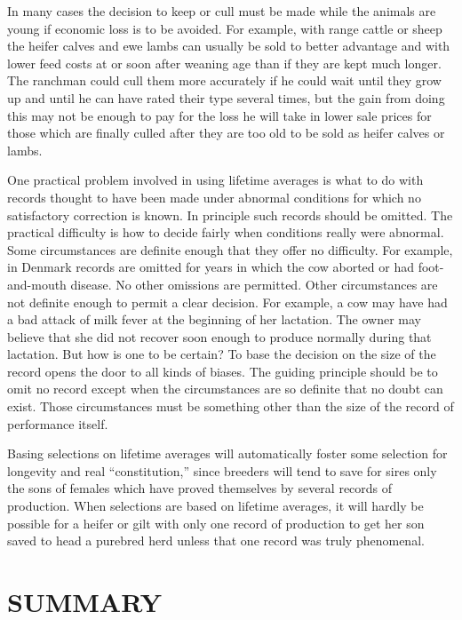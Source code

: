 In many cases the decision to keep or cull must be made while the
animals are young if economic loss is to be avoided. For example, with
range cattle or sheep the heifer calves and ewe lambs can usually be
sold to better advantage and with lower feed costs at or soon after weaning
age than if they are kept much longer. The ranchman could cull
them more accurately if he could wait until they grow up and until he
can have rated their type several times, but the gain from doing this
may not be enough to pay for the loss he will take in lower sale prices
for those which are finally culled after they are too old to be sold as
heifer calves or lambs.

One practical problem involved in using lifetime averages is what
to do with records thought to have been made under abnormal conditions
for which no satisfactory correction is known. In principle such
records should be omitted. The practical difficulty is how to decide
fairly when conditions really were abnormal. Some circumstances are
definite enough that they offer no difficulty. For example, in Denmark
records are omitted for years in which the cow aborted or had foot-and-mouth
disease. No other omissions are permitted. Other circumstances
are not definite enough to permit a clear decision. For example, a cow
may have had a bad attack of milk fever at the beginning of her lactation.
The owner may believe that she did not recover soon enough to
produce normally during that lactation. But how is one to be certain?
To base the decision on the size of the record opens the door to all
kinds of biases. The guiding principle should be to omit no record
except when the circumstances are so definite that no doubt can exist.
Those circumstances must be something other than the size of the record
of performance itself.

Basing selections on lifetime averages will automatically foster some
selection for longevity and real ``constitution,'' since breeders will tend
to save for sires only the sons of females which have proved themselves
by several records of production. When selections are based on lifetime
averages, it will hardly be possible for a heifer or gilt with only one
record of production to get her son saved to head a purebred herd
unless that one record was truly phenomenal.

\section*{SUMMARY}


